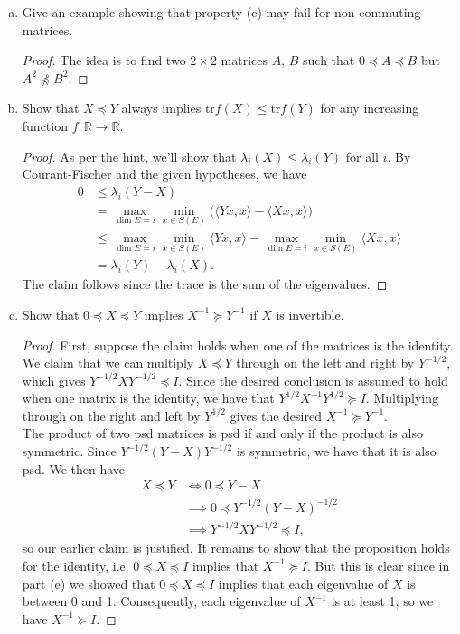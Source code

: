 \documentclass[11pt,letterpaper]{report}
\newcommand{\reals}{\mathbb{R}}
\newcommand{\tr}{\text{tr}}
\begin{document}
\begin{enumerate}[(a)]
	\item Give an example showing that property (c) may fail for non-commuting matrices.
	\begin{proof}
		The idea is to find two $2\times 2$ matrices $A$, $B$ such that $0\preceq A\preceq B$ but $A^2 \not\preceq B^2$.
	\end{proof}





	\item Show that $X\preceq Y$ always implies $\tr f(X) \leq\tr f(Y)$ for any increasing function $f:\reals\to \reals$.
	\begin{proof}
		As per the hint, we'll show that $\lambda_i(X)\leq \lambda_i(Y)$ for all $i$. By Courant-Fischer and the given hypotheses, we have
		\begin{align*}
			0 &\leq \lambda_i(Y-X)\\
			&= \max_{\dim E = i}\min_{x\in S(E)}\big(\langle Yx, x\rangle - \langle Xx,x\rangle\big)\\
			&\leq \max_{\dim E = i}\min_{x\in S(E)}\langle Yx,x\rangle - \max_{\dim E=i}\min_{x\in S(E)}\langle Xx,x\rangle\\
			&= \lambda_i(Y)-\lambda_i(X).
		\end{align*}
		The claim follows since the trace is the sum of the eigenvalues.
	\end{proof}





	\item Show that $0\preceq X\preceq Y$ implies $X^{-1}\succeq Y^{-1}$ if $X$ is invertible.
	\begin{proof}
		First, suppose the claim holds when one of the matrices is the identity. We claim that we can multiply $X\preceq Y$ through on the left and right by $Y^{-1/2}$, which gives $Y^{-1/2}XY^{-1/2}\preceq I$. Since the desired conclusion is assumed to hold when one matrix is the identity, we have that $Y^{1/2}X^{-1}Y^{1/2}\succeq I$. Multiplying through on the right and left by $Y^{1/2}$ gives the desired $X^{-1}\succeq Y^{-1}$.\\

		The product of two psd matrices is psd if and only if the product is also symmetric. Since $Y^{-1/2}(Y-X)Y^{-1/2}$ is symmetric, we have that it is also psd. We then have
		\begin{align*}
			X\preceq Y &\iff 0 \preceq Y-X\\
			& \implies 0 \preceq Y^{-1/2}(Y-X)^{-1/2}\\
			&\implies Y^{-1/2}XY^{-1/2}\preceq I,
		\end{align*}
		so our earlier claim is justified. It remains to show that the proposition holds for the identity, i.e. $0\preceq X\preceq I$ implies that $X^{-1}\succeq I$. But this is clear since in part (e) we showed that $0\preceq X\preceq I$ implies that each eigenvalue of $X$ is between 0 and 1. Consequently, each eigenvalue of $X^{-1}$ is at least 1, so we have $X^{-1}\succeq I$.
	\end{proof}






\end{enumerate}
\end{document}
